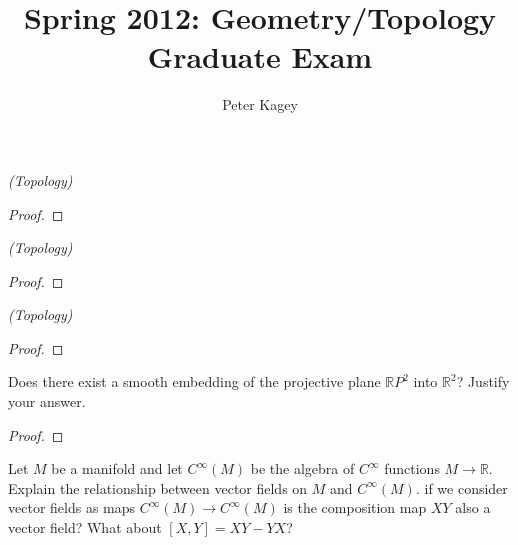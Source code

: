 \documentclass{article}
\newenvironment{problem}[2][Problem]{\begin{trivlist}
\item[\hskip \labelsep {\bfseries #1}\hskip \labelsep {\bfseries #2.}]}{\end{trivlist}}
\begin{document}
\title{Spring 2012: Geometry/Topology Graduate Exam}
\author{Peter Kagey}

\maketitle

\begin{problem}{1} \textit{(Topology)}
\end{problem}

\begin{proof}
\end{proof}

\pagebreak

\begin{problem}{2} \textit{(Topology)}
\end{problem}

\begin{proof}
\end{proof}

\pagebreak

\begin{problem}{3} \textit{(Topology)}
\end{problem}

\begin{proof}
\end{proof}

\pagebreak

\begin{problem}{4}
  Does there exist a smooth embedding of the projective plane $\mathbb{R}P^2$
  into $\mathbb{R}^2$? Justify your answer.
\end{problem}

\begin{proof}
\end{proof}

\pagebreak

\begin{problem}{5}
  Let $M$ be a manifold and let $C^\infty(M)$ be the algebra of $C^\infty$
  functions $M \rightarrow \mathbb{R}$. Explain the relationship between vector
  fields on $M$ and $C^\infty(M)$. if we consider vector fields as maps
  $C^\infty(M) \rightarrow C^\infty(M)$ is the composition map $XY$ also a
  vector field? What about $[X, Y] = XY - YX$?
\end{problem}
\end{document}
